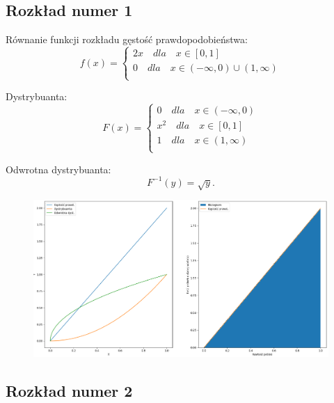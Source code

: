 \documentclass[12pt,a4paper]{article}
\begin{document}
  \subsection{Rozkład numer 1}
  
    Równanie funkcji rozkładu gęstość prawdopodobieństwa:
    \begin{equation}
      f(x) = \begin{cases}
          2x \quad dla \quad x  \in [0,1]\\
          0 \quad dla \quad x  \in (-\infty, 0) \cup (1, \infty)\\
        \end{cases}   
    \end{equation}

    Dystrybuanta:
    \begin{equation}
      F(x) = \begin{cases}
          0 \quad dla \quad x  \in (-\infty, 0)\\
          x^2 \quad dla \quad x  \in [0, 1]\\
          1 \quad dla \quad x  \in (1, \infty)\\
        \end{cases}   
    \end{equation}

    Odwrotna dystrybuanta:
    \begin{equation}
      F^{-1}(y) = \sqrt{y}.
    \end{equation}

  \begin{figure}[H]
    \centering
    \includegraphics[width=1\textwidth]{figures/Figure_16.png}
    \label{fig:16}
  \end{figure}


  \subsection{Rozkład numer 2}
  
\end{document}
